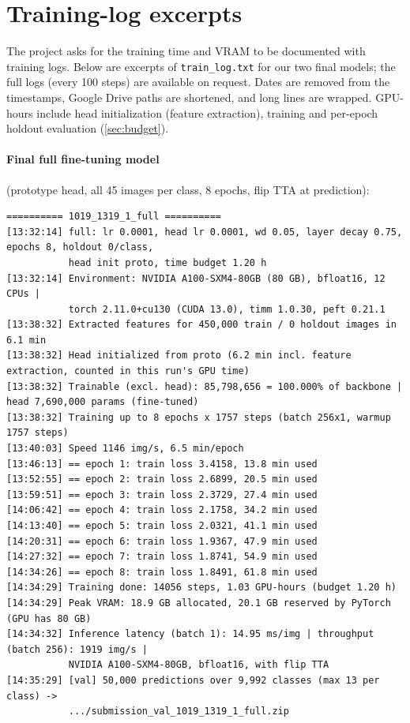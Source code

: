 \clearpage
\onecolumn
\appendix

\section{Training-log excerpts}
\label{sec:logs}

The project asks for the training time and VRAM to be documented with training logs.
Below are excerpts of \texttt{train\_log.txt} for our two final models; the full logs (every 100 steps) are available on request.
Dates are removed from the timestamps, Google Drive paths are shortened, and long lines are wrapped.
GPU-hours include head initialization (feature extraction), training and per-epoch holdout evaluation (\cref{sec:budget}).

\paragraph{Final full fine-tuning model} (prototype head, all 45 images per class, 8 epochs, flip TTA at prediction):
{\scriptsize
\begin{verbatim}
========== 1019_1319_1_full ==========
[13:32:14] full: lr 0.0001, head lr 0.0001, wd 0.05, layer decay 0.75, epochs 8, holdout 0/class,
           head init proto, time budget 1.20 h
[13:32:14] Environment: NVIDIA A100-SXM4-80GB (80 GB), bfloat16, 12 CPUs |
           torch 2.11.0+cu130 (CUDA 13.0), timm 1.0.30, peft 0.21.1
[13:38:32] Extracted features for 450,000 train / 0 holdout images in 6.1 min
[13:38:32] Head initialized from proto (6.2 min incl. feature extraction, counted in this run's GPU time)
[13:38:32] Trainable (excl. head): 85,798,656 = 100.000% of backbone | head 7,690,000 params (fine-tuned)
[13:38:32] Training up to 8 epochs x 1757 steps (batch 256x1, warmup 1757 steps)
[13:40:03] Speed 1146 img/s, 6.5 min/epoch
[13:46:13] == epoch 1: train loss 3.4158, 13.8 min used
[13:52:55] == epoch 2: train loss 2.6899, 20.5 min used
[13:59:51] == epoch 3: train loss 2.3729, 27.4 min used
[14:06:42] == epoch 4: train loss 2.1758, 34.2 min used
[14:13:40] == epoch 5: train loss 2.0321, 41.1 min used
[14:20:31] == epoch 6: train loss 1.9367, 47.9 min used
[14:27:32] == epoch 7: train loss 1.8741, 54.9 min used
[14:34:26] == epoch 8: train loss 1.8491, 61.8 min used
[14:34:29] Training done: 14056 steps, 1.03 GPU-hours (budget 1.20 h)
[14:34:29] Peak VRAM: 18.9 GB allocated, 20.1 GB reserved by PyTorch (GPU has 80 GB)
[14:34:32] Inference latency (batch 1): 14.95 ms/img | throughput (batch 256): 1919 img/s |
           NVIDIA A100-SXM4-80GB, bfloat16, with flip TTA
[14:35:29] [val] 50,000 predictions over 9,992 classes (max 13 per class) ->
           .../submission_val_1019_1319_1_full.zip
\end{verbatim}
}

